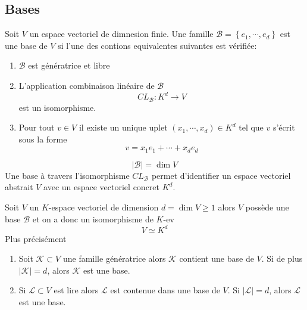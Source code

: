 \documentclass[../main.tex]{subfiles}
\begin{document}
\subsection{Bases}
\begin{defn}
	Soit $V$ un espace vectoriel de dimnesion finie. Une famille $\mathcal{B} = \left\{ e_1, \cdots, e_d \right\} $ est une base de $V$ si l'une des contions equivalentes suivantes est vérifiée:
	\begin{enumerate}
	\item $\mathcal{B}$ est génératrice et libre
	\item L'application combinaison linéaire de $\mathcal{B}$ 
		\[ 
		CL_{\mathcal{B}} : K^{d} \to V
		\]
		est un isomorphisme.
	\item Pour tout $v\in V$ il existe un unique uplet $ ( x_1,\cdots, x_d) \in K^{d}$ tel que $v$ s'écrit sous la forme
		\[ 
		v= x_1e_1 + \cdots + x_d e_d
		\]
		
	\end{enumerate}
	
\end{defn}
\begin{rmq}
\[ 
|\mathcal{B}| = \dim V
\]
Une base à travers l'isomorphisme $CL_{\mathcal{B}} $ permet d'identifier un espace vectoriel abstrait $V$ avec un espace vectoriel concret $K^{d}$.

\end{rmq}
\begin{thm}
Soit $V$ un $K$-espace vectoriel de dimension $d = \dim V \geq 1$ alors $V$ possède une base $\mathcal{B}$ et on a donc un isomorphisme de $K$-ev
\[ 
V \simeq K ^{d}
\]
Plus précisément
\begin{enumerate}
\item Soit $ \mathcal{K} \subset V$  une famille génératrice alors $\mathcal{K}$ contient une base de $V$. Si de plus $ |\mathcal{K}| =d$, alors $ \mathcal{K}$ est une base.
\item Si $\mathcal{L}\subset V$ est lire alors $\mathcal{L}$ est contenue dans une base de $V$. Si $| \mathcal{L}| =d$, alors $\mathcal{L}$ est une base.
\end{enumerate}

\end{thm}
\end{document}
